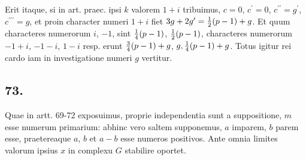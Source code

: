 \documentclass[twoside,12pt, showframe]{memoir}
\let\oldfrac\frac
\def\frac#1#2{\mathchoice{\tfrac{#1}{#2}}{\oldfrac{#1}{#2}}{\genfrac{}{}{}{2}{#1}{#2\mathstrut}}{\genfrac{}{}{}{3}{#1}{#2\mathstrut}}}
\begin{document}
Erit itaque, si in art. praec. ipsi \(k\) valorem \(1+i\) tribuimus, \(c=0\), \( c^{\prime}=0\), \(c^{\prime \prime}=g^{\prime}\), \( c^{\prime \prime \prime}=g\), et proin character numeri \(1+i\) fiet \(3 g+2 g^{\prime}=\frac{1}{2}(p-1)+g\). Et quum characteres numerorum \(i\), \(-1\), sint \(\frac{1}{4}(p-1)\), \( \frac{1}{2}(p-1)\), characteres numerorum \(-1+i\), \(-1-i\), \( 1-i\) resp. erunt \(\frac{3}{4}(p-1)+g\), \( g, \frac{1}{4}(p-1)+g\). Totus igitur rei cardo iam in investigatione numeri \(g\) vertitur.

\subsection*{73.}
 
Quae in artt. 69-72 exposuimus, proprie independentia sunt a suppositione, \(m\) esse numerum primarium: abhinc vero saltem supponemus, \(a\) imparem, \(b\) parem esse, praetereaque \(a\), \(b\) et \(a-b\) esse numeros positivos. Ante omnia limites valorum ipsius \(x\) in complexu \(G\) stabilire oportet.\clearpage\noindent%
 
\end{document}
